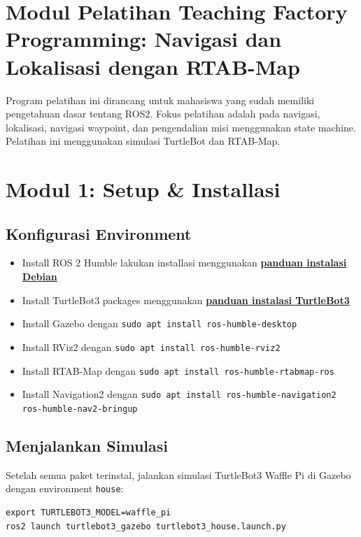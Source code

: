 \documentclass{article}
\begin{document}


\section*{Modul Pelatihan Teaching Factory Programming: Navigasi dan Lokalisasi dengan RTAB-Map}
Program pelatihan ini dirancang untuk mahasiswa yang sudah memiliki pengetahuan dasar tentang ROS2.
Fokus pelatihan adalah pada navigasi, lokalisasi, navigasi waypoint, dan pengendalian misi menggunakan state machine.
Pelatihan ini menggunakan simulasi TurtleBot dan RTAB-Map.

\section{Modul 1: Setup \& Installasi}

\subsection{Konfigurasi Environment}
\begin{itemize}
  \item Install ROS 2 Humble
        lakukan installasi menggunakan \href{https://docs.ros.org/en/humble/Installation/Ubuntu-Install-Debs.html}{\textbf{panduan instalasi Debian}}
  \item Install TurtleBot3 packages menggunakan \href{https://emanual.robotis.com/docs/en/platform/turtlebot3/quick-start/#installing-turtlebot3-packages}{\textbf{panduan instalasi TurtleBot3}}
  \item Install Gazebo dengan \texttt{sudo apt install ros-humble-desktop}
  \item Install RViz2 dengan \texttt{sudo apt install ros-humble-rviz2}
  \item Install RTAB-Map dengan \texttt{sudo apt install ros-humble-rtabmap-ros}
  \item Install Navigation2 dengan \texttt{sudo apt install ros-humble-navigation2 ros-humble-nav2-bringup}
\end{itemize}

\subsection{Menjalankan Simulasi}
Setelah semua paket terinstal, jalankan simulasi TurtleBot3 Waffle Pi di Gazebo dengan environment \texttt{house}:
\begin{verbatim}
export TURTLEBOT3_MODEL=waffle_pi
ros2 launch turtlebot3_gazebo turtlebot3_house.launch.py
\end{verbatim}
\end{document}
